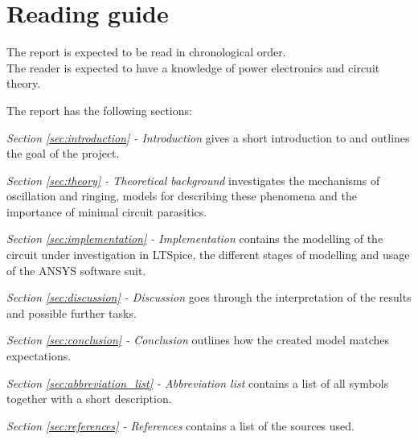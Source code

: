 \section{Reading guide}
The report is expected to be read in chronological order. \\

The reader is expected to have a knowledge of power electronics and circuit theory.

\medskip
The report has the following sections:

\medskip
\emph{Section \ref{sec:introduction} - Introduction} gives a short introduction to and outlines the goal of the project.

\medskip
\emph{Section \ref{sec:theory} - Theoretical background} investigates the mechanisms of oscillation and ringing, models for describing these phenomena and the importance of minimal circuit parasitics.

\medskip
\emph{Section \ref{sec:implementation} - Implementation} contains the modelling of the circuit under investigation in LTSpice, the different stages of modelling and usage of the ANSYS software suit.

\medskip
\emph{Section \ref{sec:discussion} - Discussion} goes through the interpretation of the results and possible further tasks.

\medskip
\emph{Section \ref{sec:conclusion} - Conclusion} outlines how the created model matches expectations.

\medskip
\emph{Section \ref{sec:abbreviation_list} - Abbreviation list} contains a list of all symbols together with a short description.


\medskip
\emph{Section \ref{sec:references} - References} contains a list of the sources used.
